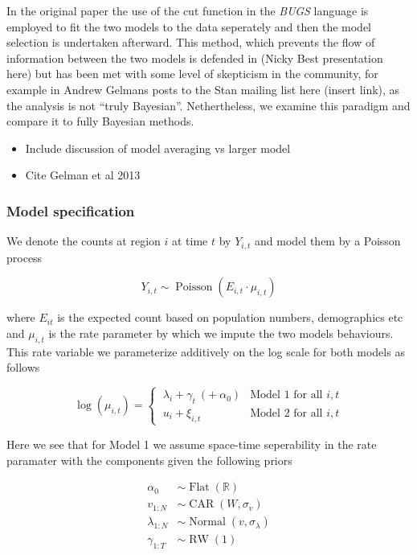 \documentclass{article}
\begin{document}
In the original paper \cite{baystdetect} the use of the cut function in the \emph{BUGS} language is employed to fit the two models to the data seperately and then the model selection is undertaken afterward. This method, which prevents the flow of information between the two models is defended in (Nicky Best presentation here) but has been met with some level of skepticism in the community, for example in Andrew Gelmans posts to the Stan mailing list here (insert link), as the analysis is not ``truly Bayesian''. Nethertheless, we examine this paradigm and compare it to fully Bayesian methods. 

\begin{itemize}
\item Include discussion of model averaging vs larger model
\item Cite Gelman et al 2013
\end{itemize}

\subsubsection{Model specification}

We denote the counts at region $i$ at time $t$ by $Y_{i,t}$ and model them by a Poisson process

\begin{equation}
Y_{i,t} \sim \operatorname{Poisson}(E_{i,t} \cdot \mu_{i,t})
\end{equation}

where $E_{it}$ is the expected count based on population numbers, demographics etc and $\mu_{i,t}$ is the rate parameter by which we impute the two models behaviours. This rate variable we parameterize additively on the log scale for both models as follows

\begin{equation}
\log{(\mu_{i,t})} = \begin{cases}
\ \lambda_{i} + \gamma_{t} \  (+ \  \alpha_0) & \textrm{Model 1 for all } i, t \\
\ u_{i} + \xi_{i,t} & \textrm{Model 2 for all } i, t
\end{cases}
\end{equation} 

Here we see that for Model 1 we assume space-time seperability in the rate paramater with the components given the following priors

\begin{align}
\alpha_0 &\sim \operatorname{Flat}(\mathbb{R}) \\
v_{1:N} &\sim \operatorname{CAR}(W, \sigma_v) \\
\lambda_{1:N} &\sim \operatorname{Normal}(v, \sigma_\lambda) \\
\gamma_{1:T} &\sim \operatorname{RW}(1)
\end{align}
\end{document}
